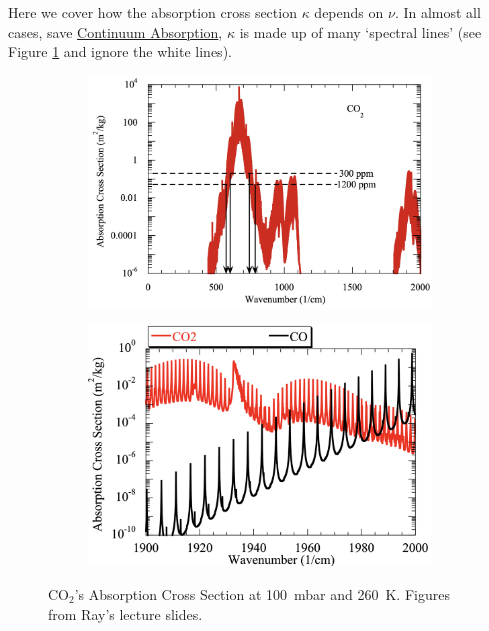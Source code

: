 Here we cover how the absorption cross section $\kappa$ depends on $\nu$. In almost all cases, save \hyperref[Continuum]{Continuum Absorption}, $\kappa$ is made up of many `spectral lines' (see Figure \ref{CO2 zoomed} and ignore the white lines).
\begin{figure}[H]
    \centering
    \begin{subfigure}{0.4\linewidth}
        \includegraphics[width=\linewidth]{Figures/Radiative Transfer/CO2 kappa}
    \end{subfigure}
    \quad
    \begin{subfigure}{0.4\linewidth}
        \includegraphics[width=\linewidth]{Figures/Radiative Transfer/CO2 zoomed.png}
        \label{CO2 zoomed}
    \end{subfigure}
    \caption{CO$_2$'s Absorption Cross Section at \qty{100}{\milli\bar} and \qty{260}{\kelvin}. Figures from Ray's lecture slides.}
    \label{CO2 kappa}
\end{figure}
